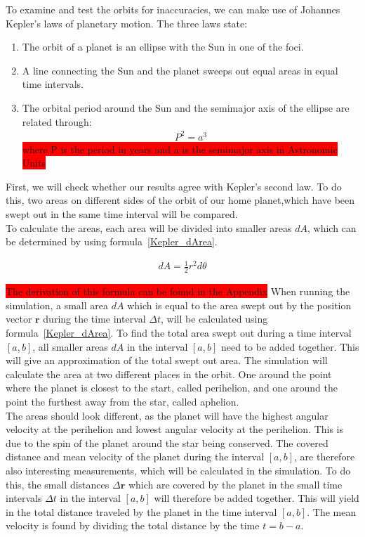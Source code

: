 \documentclass[reprint,english,notitlepage]{revtex4-2}
\begin{document}
To examine and test the orbits for inaccuracies, we can make use of Johannes Kepler's laws of planetary motion.
The three laws state:
\begin{enumerate}
    \item The orbit of a planet is an ellipse with the
		Sun in one of the foci.
	\item A line connecting the Sun and the planet
		sweeps out equal areas in equal time intervals.
	\item The orbital period around the Sun and the
		semimajor axis of the ellipse are related through:
		\begin{align*}
		    P^2 = a^3
		\end{align*}
		\colorbox{red}{where P is the period in years and a is the
		semimajor axis in Astronomic Units}
\end{enumerate}

First, we will check whether our results agree with Kepler's second law.
To do this, two areas on different sides of the orbit of our home planet,which have been swept out in the same time interval will be compared.\\
To calculate the areas, each area will be divided into smaller areas $dA$, which can be determined by using formula~\eqref{Kepler_dArea}.

\begin{align} \label{Kepler_dArea}
    dA = \frac{1}{2}r^2 d\theta
\end{align}

\colorbox{red}{The derivation of this formula can be found in the Appendix}
When running the simulation, a small area $dA$ which is equal to the area swept out by the position vector $\textbf{r}$ during the time interval $\Delta t$, will be calculated using formula~\eqref{Kepler_dArea}.
To find the total area swept out during a time interval $[a, b]$, all smaller areas $dA$ in the interval $[a, b]$ need to be added together.
This will give an approximation of the total swept out area.
The simulation will calculate the area at two different places in the orbit.
One around the point where the planet is closest to the start, called perihelion, and one around the point the furthest away from the star, called aphelion.\\
The areas should look different, as the planet will have the highest angular velocity at the perihelion and lowest angular velocity at the perihelion.
This is due to the spin of the planet around the star being conserved.
The covered distance and mean velocity of the planet during the interval $[a, b]$, are therefore also interesting measurements, which will be calculated in the simulation.
To do this, the small distances $\Delta \textbf{r}$ which are covered by the planet in the small time intervals $\Delta t$ in the interval $[a, b]$ will therefore be added together.
This will yield in the total distance traveled by the planet in the time interval $[a, b]$.
The mean velocity is found by dividing the total distance by the time $t = b-a$.\\
\end{document}
